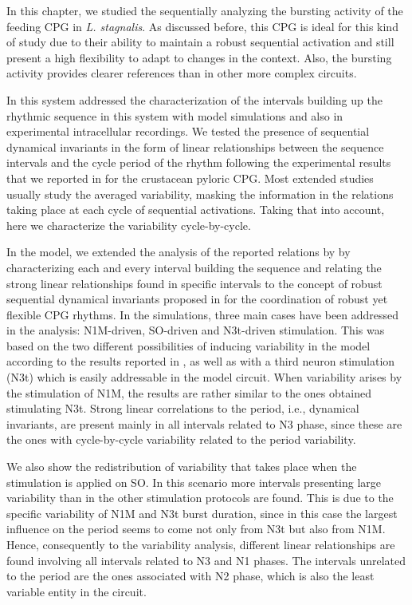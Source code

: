 In this chapter, we studied the sequentially analyzing the bursting activity of the feeding CPG in \textit{L. stagnalis}. As discussed before, this CPG is ideal for this kind of study due to their ability to maintain a robust sequential activation and still present a high flexibility to adapt to changes in the context. Also, the bursting activity provides clearer references than in other more complex circuits. 

In this system addressed the characterization of the intervals building up the rhythmic sequence in this system with model simulations and also in experimental intracellular recordings. We tested the presence of sequential dynamical invariants in the form of linear relationships between the sequence intervals and the cycle period of the rhythm following the experimental results that we reported in \textcite{elices_robust_2019} for the crustacean pyloric CPG. Most extended studies usually study the averaged variability, masking the information in the relations taking place at each cycle of sequential activations. Taking that into account, here we characterize the variability cycle-by-cycle. 

In the model, we extended the analysis of the reported relations by \textcite{elliott_temporal_1991} by characterizing each and every interval building the sequence and relating the strong linear relationships found in specific intervals to the concept of robust sequential dynamical invariants proposed in \textcite{elices_robust_2019} for the coordination of robust yet flexible CPG rhythms. In the simulations, three main cases have been addressed in the analysis: N1M-driven, SO-driven and N3t-driven stimulation. This was based on the two different possibilities of inducing variability in the model according to the results reported in \textcite{vavoulis_dynamic_2007}, as well as with a third neuron stimulation (N3t) which is easily addressable in the model circuit. When variability arises by the stimulation of N1M, the results are rather similar to the ones obtained stimulating N3t. Strong linear correlations to the period, i.e.,  dynamical invariants, are present mainly in all intervals related to N3 phase, since these are the ones with cycle-by-cycle variability related to the period variability.  

We also show the redistribution of variability that takes place when the stimulation is applied on SO. In this scenario more intervals presenting large variability than in the other stimulation protocols are found. This is due to the specific variability of N1M and N3t burst duration, since in this case the largest influence on the period seems to come not only from N3t but also from N1M. Hence, consequently to the variability analysis, different linear relationships are found involving all intervals related to N3 and N1 phases. The intervals unrelated to the period are the ones associated with N2 phase, which is also the least variable entity in the circuit. 

